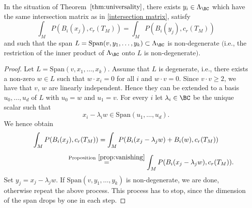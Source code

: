 \begin{Lemma} \label{lemma:replace with non-degenerate}
In the situation of Theorem~$\ref{thm:universality}$, there exists $y_i \in \Lambda_{\BC}$ which have the same intersection matrix as in \eqref{intersection matrix},
satisfy
\[ \int_{M} P( B_i(x_j), c_r(T_M) ) = \int_{M} P( B_i(y_j), c_r(T_M) ) \]
and such that the span $L = \mathrm{Span}( v, y_1, \dots, y_k ) \subset \Lambda_{\BC}$ is non-degenerate $($i.e., the restriction of the inner product of $\Lambda_{\BC}$ onto $L$ is non-degenerate$)$.
\end{Lemma}

\begin{proof}
Let $L = \mathrm{Span}(v, x_1, \dots, x_k)$.
Assume that $L$ is degenerate, i.e., there exists a non-zero $w \in L$ such that $w \cdot x_i = 0$ for all $i$ and $w \cdot v=0$.
Since $v \cdot v \geq 2$, we have that $v$, $w$ are linearly independent. Hence they can be extended to a basis $u_0, \dots, u_d$ of $L$ with $u_0 = w$ and $u_1=v$.
For every $i$ let $\lambda_i \in \BC$ be the unique scalar such that
\[
x_i - \lambda_i w \in \mathrm{Span}( u_1, \dots, u_d ).
\]
We hence obtain
\begin{gather*}
\int_{M} P( B_i(x_j), c_r(T_M) ) =
\int_{M} P( B_i(x_j - \lambda_j w) + B_i(w), c_r(T_M) )
\\[1ex] \qquad\qquad\qquad\quad\,
{} \overset{\rm Proposition~\ref{prop:vanishing}}{=}
\int_{M} P( B_i(x_j - \lambda_j w), c_r(T_M) ).
\end{gather*}
Set $y_j = x_j - \lambda_j w$. If $\mathrm{Span}(v, y_1, \dots, y_k)$ is non-degenerate, we are done,
otherwise repeat the above process. This process has to stop, since the dimension of the span drops by one in each step.
\end{proof}


